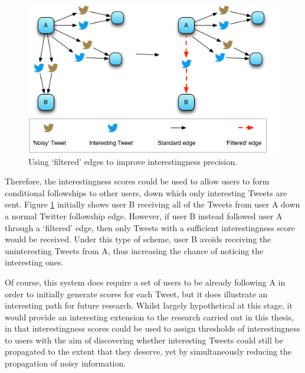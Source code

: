 \begin{figure}[h]
\centering
\includegraphics[scale=0.8]{6.Conclusions/Media/retweet_path.png} 
\caption{Using `filtered' edges to improve interestingness precision.}
\label{fig:removed_link}
\end{figure}

Therefore, the interestingness scores could be used to allow users to form conditional followships to other users, down which only interesting Tweets are sent. Figure \ref{fig:removed_link} initially shows user B receiving all of the Tweets from user A down a normal Twitter followship edge. However, if user B instead followed user A through a `filtered' edge, then only Tweets with a sufficient interestingness score would be received. Under this type of scheme, user B avoids receiving the uninteresting Tweets from A, thus increasing the chance of noticing the interesting ones.


Of course, this system does require a set of users to be already following A in order to initially generate scores for each Tweet, but it does illustrate an interesting path for future research. Whilst largely hypothetical at this stage, it would provide an interesting extension to the research carried out in this thesis, in that interestingness scores could be used to assign thresholds of interestingness to users with the aim of discovering whether interesting Tweets could still be propagated to the extent that they deserve, yet by simultaneously reducing the propagation of noisy information. 

